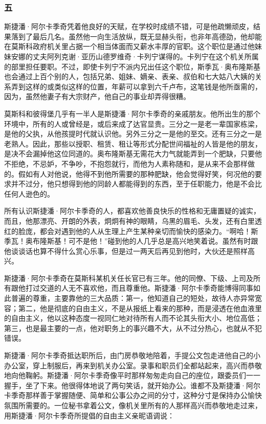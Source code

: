 \subsubsection*{五}

\par 斯捷潘·阿尔卡季奇凭着他良好的天赋，在学校时成绩不错，可是他疏懒顽皮，结果落到了最后几名。虽然他一向生活放纵，既无显赫头衔，也非年高德劭，他却能在莫斯科政府机关里占据一个相当体面而又薪水丰厚的官职。这个职位是通过他妹妹安娜的丈夫阿列克谢·亚历山德罗维奇·卡列宁谋得的。卡列宁在这个机关所属的部里担任要职。不过，即使卡列宁不派内兄出任这个职位，斯季瓦·奥布隆斯基也会通过上百个别的人，包括兄弟、姐妹、嫡亲、表亲、叔伯和七大姑八大姨的关系弄到这样的或类似这样的位置，年薪可以拿到六千卢布，这笔钱是他所亟需的，因为，虽然他妻子有大宗财产，他自己的事业却弄得很糟。
\par 莫斯科和彼得堡几乎有一半人是斯捷潘·阿尔卡季奇的亲戚朋友。他所出生的那个环境中，所有的人或曾经是，或后来成了达官显贵。三分之一是老一辈国家栋梁，是他的父执，从他孩提时代就认识他。另外三分之一是他的至交。还有三分之一是老熟人。因此，那些以授职、租赁、租让等形式分配世间福祉的人皆是他的朋友，是决不会漏掉他这位同道的。奥布隆斯基无需花大力气就能弄到一个肥缺，只要他不拒绝，不忌妒，不争吵，不抱怨就行，而他为人素称随和，是从来不会那样做的。假如有人对他说，他得不到他所需要的那种肥缺，他会觉得好笑，何况他的要求并不过分，他只想得到他的同龄人都能得到的东西，至于任职能力，他是不会比任何人逊色的。
\par 所有认识斯捷潘·阿尔卡季奇的人，都喜欢他善良快乐的性格和无庸置疑的诚实，而且，他那漂亮、开朗的外表，炯炯有神的眼睛，乌黑的眉毛、头发，还有白里透红的脸庞，都会对遇到他的人从生理上产生某种亲切而愉快的感染力。“啊哈！斯季瓦！奥布隆斯基！可不是他！”碰到他的人几乎总是高兴地笑着说。虽然有时跟他谈谈话也算不得什么赏心乐事，但是过一两天后再见到他时，大伙还是照样高兴。
\par 斯捷潘·阿尔卡季奇在莫斯科某机关任长官已有三年。他的同僚、下级、上司及所有跟他打过交道的人无不喜欢他，而且尊重他。斯捷潘·阿尔卡季奇能博得同事如此普遍的尊重，主要靠他的三大品质：第一，他知道自己的短处，故待人亦异常宽容；第二，他是彻底的自由主义，不是从报纸上看来的那种，而是浸透在他血液里的自由主义，他以这种态度一视同仁地对待所有人而不论其头衔大小、地位高低；第三，也是最主要的一点，他对职务上的事兴趣不大，从不过分热心，也就从不犯错误。
\par 斯捷潘·阿尔卡季奇抵达职所后，由门房恭敬地陪着，手提公文包走进他自己的小办公室，穿上制服后，再来到机关办公室。录事和职员们全都站起来，高兴而恭敬地向他鞠躬。斯捷潘·阿尔卡季奇像平时那样匆匆走向自己的座位，跟委员们一一握手，坐了下来。他很得体地说了两句笑话，就开始办公。谁都不及斯捷潘·阿尔卡季奇那样善于掌握随便、简单和公事公办之间的分寸，这种分寸是保持办公愉快氛围所需要的。一位秘书拿着公文，像机关里所有的人那样高兴而恭敬地走过来，用斯捷潘·阿尔卡季奇所提倡的自由主义亲昵语调说：

